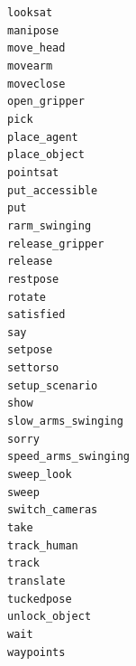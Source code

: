 \documentclass[compress]{beamer}
\begin{document}
{\begin{frame}{}
\begin{multicols}{4}
{\tt looksat} \\
{\tt manipose} \\
{\tt move\_head} \\
{\tt movearm} \\
{\tt moveclose} \\
{\tt open\_gripper} \\
{\tt pick} \\
{\tt place\_agent} \\
{\tt place\_object} \\
{\tt pointsat} \\
{\tt put\_accessible} \\
{\tt put} \\
{\tt rarm\_swinging} \\
{\tt release\_gripper} \\
{\tt release} \\
{\tt restpose} \\
{\tt rotate} \\
{\tt satisfied} \\
{\tt say} \\
{\tt setpose} \\
{\tt settorso} \\
{\tt setup\_scenario} \\
{\tt show} \\
{\tt slow\_arms\_swinging} \\
{\tt sorry} \\
{\tt speed\_arms\_swinging} \\
{\tt sweep\_look} \\
{\tt sweep} \\
{\tt switch\_cameras} \\
{\tt take} \\
{\tt track\_human} \\
{\tt track} \\
{\tt translate} \\
{\tt tuckedpose} \\
{\tt unlock\_object} \\
{\tt wait} \\
{\tt waypoints} \\
    \end{multicols}
\end{frame}
}

\end{document}
